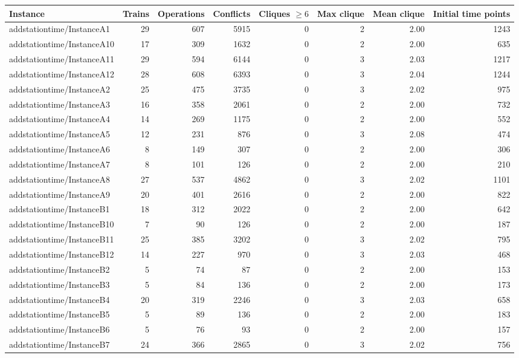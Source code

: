 \begin{tabular}{lrrrrrrr}
\toprule
Instance & Trains & Operations & Conflicts & Cliques $\geq 6$ & Max clique & Mean clique & Initial time points \\
\midrule
addstationtime/InstanceA1 & 29 & 607 & 5915 & 0 & 2 & 2.00 & 1243 \\
addstationtime/InstanceA10 & 17 & 309 & 1632 & 0 & 2 & 2.00 & 635 \\
addstationtime/InstanceA11 & 29 & 594 & 6144 & 0 & 3 & 2.03 & 1217 \\
addstationtime/InstanceA12 & 28 & 608 & 6393 & 0 & 3 & 2.04 & 1244 \\
addstationtime/InstanceA2 & 25 & 475 & 3735 & 0 & 3 & 2.02 & 975 \\
addstationtime/InstanceA3 & 16 & 358 & 2061 & 0 & 2 & 2.00 & 732 \\
addstationtime/InstanceA4 & 14 & 269 & 1175 & 0 & 2 & 2.00 & 552 \\
addstationtime/InstanceA5 & 12 & 231 & 876 & 0 & 3 & 2.08 & 474 \\
addstationtime/InstanceA6 & 8 & 149 & 307 & 0 & 2 & 2.00 & 306 \\
addstationtime/InstanceA7 & 8 & 101 & 126 & 0 & 2 & 2.00 & 210 \\
addstationtime/InstanceA8 & 27 & 537 & 4862 & 0 & 3 & 2.02 & 1101 \\
addstationtime/InstanceA9 & 20 & 401 & 2616 & 0 & 2 & 2.00 & 822 \\
addstationtime/InstanceB1 & 18 & 312 & 2022 & 0 & 2 & 2.00 & 642 \\
addstationtime/InstanceB10 & 7 & 90 & 126 & 0 & 2 & 2.00 & 187 \\
addstationtime/InstanceB11 & 25 & 385 & 3202 & 0 & 3 & 2.02 & 795 \\
addstationtime/InstanceB12 & 14 & 227 & 970 & 0 & 3 & 2.03 & 468 \\
addstationtime/InstanceB2 & 5 & 74 & 87 & 0 & 2 & 2.00 & 153 \\
addstationtime/InstanceB3 & 5 & 84 & 136 & 0 & 2 & 2.00 & 173 \\
addstationtime/InstanceB4 & 20 & 319 & 2246 & 0 & 3 & 2.03 & 658 \\
addstationtime/InstanceB5 & 5 & 89 & 136 & 0 & 2 & 2.00 & 183 \\
addstationtime/InstanceB6 & 5 & 76 & 93 & 0 & 2 & 2.00 & 157 \\
addstationtime/InstanceB7 & 24 & 366 & 2865 & 0 & 3 & 2.02 & 756 \\

\end{tabular}

